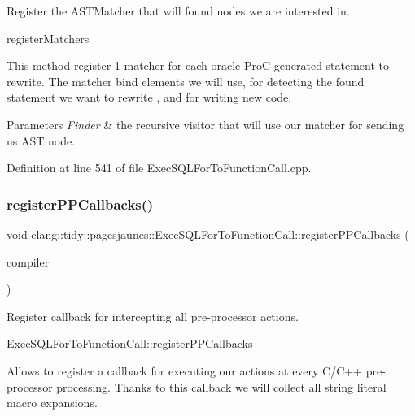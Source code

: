 Register the A\+S\+T\+Matcher that will found nodes we are interested in. 

register\+Matchers

This method register 1 matcher for each oracle ProC generated statement to rewrite. The matcher bind elements we will use, for detecting the found statement we want to rewrite , and for writing new code.


\begin{DoxyParams}{Parameters}
{\em Finder} & the recursive visitor that will use our matcher for sending us A\+ST node. \\
\hline
\end{DoxyParams}


Definition at line 541 of file Exec\+S\+Q\+L\+For\+To\+Function\+Call.\+cpp.

\mbox{\label{classclang_1_1tidy_1_1pagesjaunes_1_1_exec_s_q_l_for_to_function_call_a85b2ab87d5ebd74633e974efee0dafc6}} 
\subsubsection{\texorpdfstring{register\+P\+P\+Callbacks()}{registerPPCallbacks()}}
{\footnotesize\ttfamily void clang\+::tidy\+::pagesjaunes\+::\+Exec\+S\+Q\+L\+For\+To\+Function\+Call\+::register\+P\+P\+Callbacks (\begin{DoxyParamCaption}\item[{Compiler\+Instance \&}]{compiler }\end{DoxyParamCaption})\hspace{0.3cm}{\ttfamily [override]}}



Register callback for intercepting all pre-\/processor actions. 

\hyperlink{classclang_1_1tidy_1_1pagesjaunes_1_1_exec_s_q_l_for_to_function_call_a85b2ab87d5ebd74633e974efee0dafc6}{Exec\+S\+Q\+L\+For\+To\+Function\+Call\+::register\+P\+P\+Callbacks}

Allows to register a callback for executing our actions at every C/\+C++ pre-\/processor processing. Thanks to this callback we will collect all string literal macro expansions.


